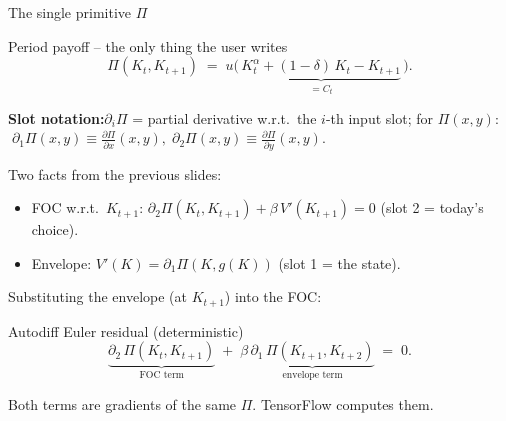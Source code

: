 \documentclass[aspectratio=169,11pt]{beamer}
\newcommand{\emphc}[1]{\textcolor{harvardcrimson}{#1}}
\begin{document}
\begin{frame}{The single primitive $\Pi$}
\scriptsize
\begin{block}{Period payoff -- the only thing the user writes}
\vspace{-8pt}
\[
\Pi(K_t, K_{t+1}) \;=\; u\!\bigl(\,\underbrace{K_t^\alpha + (1-\delta)\,K_t - K_{t+1}}_{= C_t}\,\bigr).
\]
\end{block}
\vspace{-4pt}
\textbf{Slot notation:}\;$\partial_i \Pi$ = partial derivative w.r.t.\ the \emphc{$i$-th input slot}; for $\Pi(x, y)$:
$\;\partial_1 \Pi(x,y) \equiv \tfrac{\partial \Pi}{\partial x}(x,y),\;\partial_2 \Pi(x,y) \equiv \tfrac{\partial \Pi}{\partial y}(x,y)$.

\vspace{2pt}
Two facts from the previous slides:
\begin{itemize}\itemsep0pt
\item \emphc{FOC w.r.t.\ $K_{t+1}$}: $\partial_2 \Pi(K_t, K_{t+1}) + \beta\, V'(K_{t+1}) = 0$ \;(slot 2 = today's choice).
\item \emphc{Envelope}: $V'(K) = \partial_1 \Pi(K, g(K))$ \;(slot 1 = the state).
\end{itemize}
Substituting the envelope (at $K_{t+1}$) into the FOC:
\begin{block}{Autodiff Euler residual (deterministic)}
\vspace{-8pt}
\[
\boxed{\;\underbrace{\partial_2\,\Pi(K_t, K_{t+1})}_{\text{FOC term}} \;+\; \beta\,\underbrace{\partial_1\,\Pi(K_{t+1}, K_{t+2})}_{\text{envelope term}} \;=\; 0.\;}
\]
\vspace{-10pt}
\begin{center}\emphc{Both terms are gradients of the same $\Pi$.} TensorFlow computes them.\end{center}
\end{block}
\end{frame}
\end{document}
